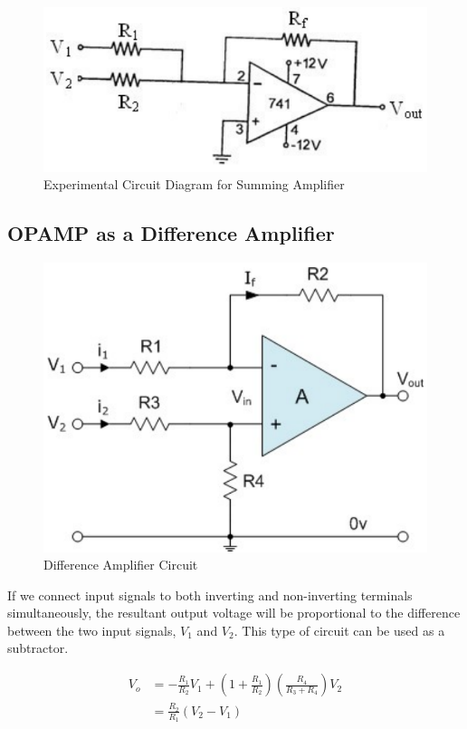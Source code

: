 \begin{figure}[H]
    \centering
    \includegraphics[width=0.8\columnwidth]{images/sum2.png}
    \caption{Experimental Circuit Diagram for Summing Amplifier}
    \label{sum2}
\end{figure}

\subsection{OPAMP as a Difference Amplifier}

\begin{figure}[H]
    \centering
    \includegraphics[width=0.8\columnwidth]{images/diff1.png}
    \caption{Difference Amplifier Circuit}
    \label{diff1}
\end{figure}

If we connect input signals to both inverting and non-inverting terminals simultaneously, the resultant output voltage will be proportional to the difference between the two input signals, $V_1$ and $V_2$. This type of circuit can be used as a subtractor.

\begin{align}
    V_o &= -\frac{R_1}{R_2}V_1 + \left(1+\frac{R_1}{R_2}\right)\left(\frac{R_4}{R_3+R_4}\right)V_2 \nonumber \\
    &= \frac{R_2}{R_1}(V_2-V_1)
\end{align}

